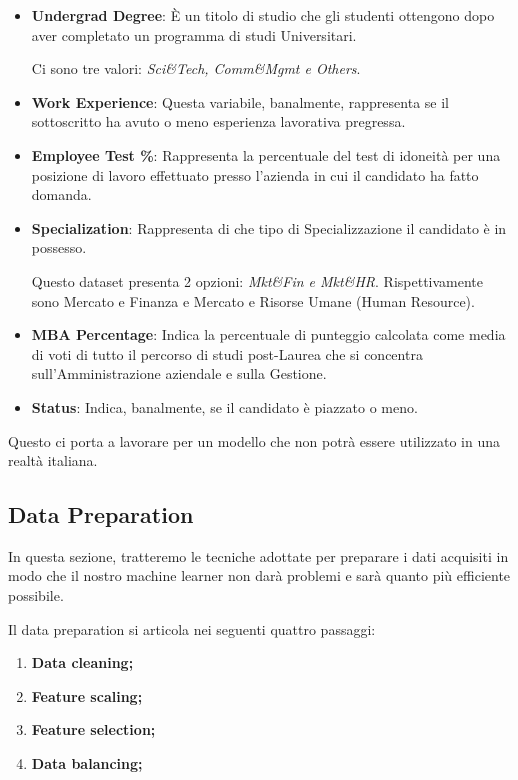 \documentclass[12pt]{article}
\begin{document}
\begin{itemize}
    \item \textbf{Undergrad Degree}: È un titolo di studio che gli studenti ottengono dopo aver completato un programma di studi Universitari. \par Ci sono tre valori: \textit{Sci\&Tech, Comm\&Mgmt e Others}.
    \item \textbf{Work Experience}: Questa variabile, banalmente, rappresenta se il sottoscritto ha avuto o meno esperienza lavorativa pregressa.
    \item \textbf{Employee Test \%}: Rappresenta la percentuale del test di idoneità per una posizione di lavoro effettuato presso l'azienda in cui il candidato ha fatto domanda.
    \item \textbf{Specialization}: Rappresenta di che tipo di Specializzazione il candidato è in possesso. \par Questo dataset presenta 2 opzioni: \textit{Mkt\&Fin e Mkt\&HR}. Rispettivamente sono Mercato e Finanza e Mercato e Risorse Umane (Human Resource).
    \item \textbf{MBA Percentage}: Indica la percentuale di punteggio calcolata come media di voti di tutto il percorso di studi post-Laurea che si concentra sull'Amministrazione aziendale e sulla Gestione.
    \item \textbf{Status}: Indica, banalmente, se il candidato è piazzato o meno.
\end{itemize}

Questo ci porta a lavorare per un modello che non potrà essere utilizzato in una realtà italiana.

\newpage

\subsection{Data Preparation}
In questa sezione, tratteremo le tecniche adottate per preparare i dati acquisiti in modo che il nostro machine learner
non darà problemi e sarà quanto più efficiente possibile.

Il data preparation si articola nei seguenti quattro passaggi:

\begin{enumerate}
    \item \textbf{Data cleaning;}
    \item \textbf{Feature scaling;}
    \item \textbf{Feature selection;}
    \item \textbf{Data balancing;}
\end{enumerate}
\end{document}
